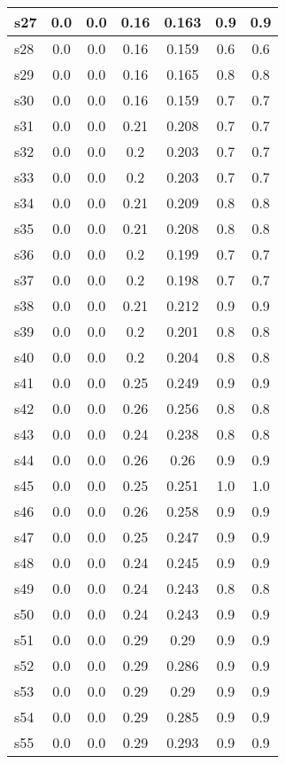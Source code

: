 \documentclass{article}
\begin{document}
\begin{tabular}{|l|c|c|c|c|c|c|}
s27 &0.0 & 0.0 & 0.16 & 0.163 & 0.9 & 0.9\\
\hline
s28 &0.0 & 0.0 & 0.16 & 0.159 & 0.6 & 0.6\\
\hline
s29 &0.0 & 0.0 & 0.16 & 0.165 & 0.8 & 0.8\\
\hline
s30 &0.0 & 0.0 & 0.16 & 0.159 & 0.7 & 0.7\\
\hline
s31 &0.0 & 0.0 & 0.21 & 0.208 & 0.7 & 0.7\\
\hline
s32 &0.0 & 0.0 & 0.2 & 0.203 & 0.7 & 0.7\\
\hline
s33 &0.0 & 0.0 & 0.2 & 0.203 & 0.7 & 0.7\\
\hline
s34 &0.0 & 0.0 & 0.21 & 0.209 & 0.8 & 0.8\\
\hline
s35 &0.0 & 0.0 & 0.21 & 0.208 & 0.8 & 0.8\\
\hline
s36 &0.0 & 0.0 & 0.2 & 0.199 & 0.7 & 0.7\\
\hline
s37 &0.0 & 0.0 & 0.2 & 0.198 & 0.7 & 0.7\\
\hline
s38 &0.0 & 0.0 & 0.21 & 0.212 & 0.9 & 0.9\\
\hline
s39 &0.0 & 0.0 & 0.2 & 0.201 & 0.8 & 0.8\\
\hline
s40 &0.0 & 0.0 & 0.2 & 0.204 & 0.8 & 0.8\\
\hline
s41 &0.0 & 0.0 & 0.25 & 0.249 & 0.9 & 0.9\\
\hline
s42 &0.0 & 0.0 & 0.26 & 0.256 & 0.8 & 0.8\\
\hline
s43 &0.0 & 0.0 & 0.24 & 0.238 & 0.8 & 0.8\\
\hline
s44 &0.0 & 0.0 & 0.26 & 0.26 & 0.9 & 0.9\\
\hline
s45 &0.0 & 0.0 & 0.25 & 0.251 & 1.0 & 1.0\\
\hline
s46 &0.0 & 0.0 & 0.26 & 0.258 & 0.9 & 0.9\\
\hline
s47 &0.0 & 0.0 & 0.25 & 0.247 & 0.9 & 0.9\\
\hline
s48 &0.0 & 0.0 & 0.24 & 0.245 & 0.9 & 0.9\\
\hline
s49 &0.0 & 0.0 & 0.24 & 0.243 & 0.8 & 0.8\\
\hline
s50 &0.0 & 0.0 & 0.24 & 0.243 & 0.9 & 0.9\\
\hline
s51 &0.0 & 0.0 & 0.29 & 0.29 & 0.9 & 0.9\\
\hline
s52 &0.0 & 0.0 & 0.29 & 0.286 & 0.9 & 0.9\\
\hline
s53 &0.0 & 0.0 & 0.29 & 0.29 & 0.9 & 0.9\\
\hline
s54 &0.0 & 0.0 & 0.29 & 0.285 & 0.9 & 0.9\\
\hline
s55 &0.0 & 0.0 & 0.29 & 0.293 & 0.9 & 0.9\\

\end{tabular}
\end{document}
